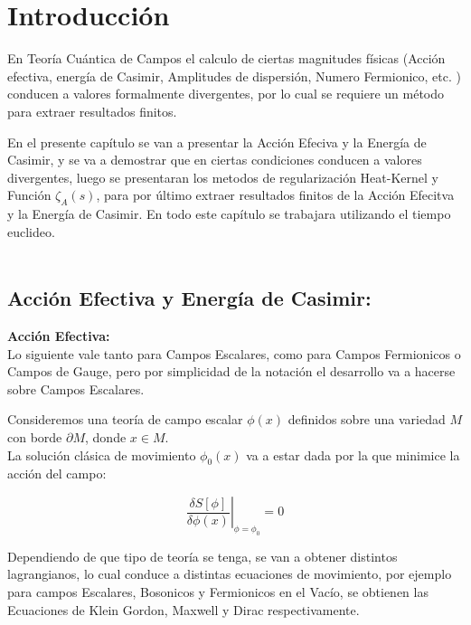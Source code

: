 \chapter{Introducción}



En Teoría Cuántica de Campos el calculo de ciertas magnitudes físicas (Acción efectiva, energía de Casimir, Amplitudes de dispersión, Numero Fermionico, etc. ) conducen a valores formalmente divergentes, por lo cual se requiere un método para extraer resultados finitos. 

En el presente capítulo se van a presentar la Acción Efeciva y la Energía de Casimir, y se va a demostrar que en ciertas condiciones conducen a valores divergentes, luego se presentaran los metodos de regularización Heat-Kernel y Función $ \zeta _A (s) $, para por último extraer resultados finitos de la Acción Efecitva y la Energía de Casimir. En todo este capítulo se trabajara utilizando el tiempo euclideo. \\ \\


\section{Acción Efectiva y Energía de Casimir: }
\textbf{Acción Efectiva:}\\

Lo siguiente vale tanto para Campos Escalares, como para Campos Fermionicos o Campos de Gauge, pero por simplicidad de la notación el desarrollo va a hacerse sobre Campos Escalares.

Consideremos una teoría de campo escalar $\phi(x)$ definidos sobre una variedad $M$ con borde $\partial M$, donde $x \in  M$. \\

La solución clásica de movimiento $ \phi _0 (x) $ va a estar dada por la que minimice la acción del campo:

\begin{equation}
\left. \frac{\delta S [ \phi ] }{\delta \phi (x)}  \right| _{\phi = \phi _0  } = 0
\end{equation}


Dependiendo de que tipo de teoría se tenga, se van a obtener distintos lagrangianos, lo cual conduce a distintas ecuaciones de movimiento, por ejemplo para campos Escalares, Bosonicos y Fermionicos en el Vacío, se obtienen las Ecuaciones de Klein Gordon, Maxwell y Dirac respectivamente.

